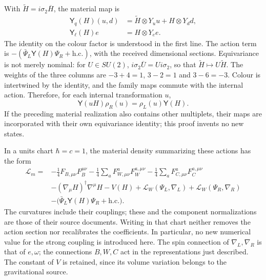 With \(\widetilde H=i\sigma_2\overline H\), the material map is
\begin{equation}
 \begin{split}
 \mathsf Y_q(H)(u,d)&=
       \widetilde H\otimes Y_u u+H\otimes Y_d d,\\
 \mathsf Y_\ell(H)e&=H\otimes Y_e e .
 \end{split}
 \label{hmtcuatro:yukawa}
\end{equation}
The identity on the colour factor is understood in the first line. The action term is \(-(\bar\Psi_L\mathsf Y(H)\Psi_R+\mathrm{h.c.})\), with the received dimensional sections. Equivariance is not merely nominal: for \(U\in SU(2)\), \(i\sigma_2\overline U=U i\sigma_2\), so that \(\widetilde H\mapsto U\widetilde H\). The weights of the three columns are \(-3+4=1\), \(3-2=1\) and \(3-6=-3\). Colour is intertwined by the identity, and the family maps commute with the internal action. Therefore, for each internal transformation \(u\),
\begin{equation}
 \mathsf Y(uH)\rho_R(u)=\rho_L(u)\mathsf Y(H).
 \label{hmtcuatro:equivariancia-yukawa}
\end{equation}
If the preceding material realization also contains other multiplets, their maps are incorporated with their own equivariance identity; this proof invents no new states.

In a units chart \(\hbar=c=1\), the material density summarizing these actions has the form
\begin{equation}
 \begin{split}
 \mathcal L_m={}&-\frac14 F_{B,\mu\nu}F_B^{\mu\nu}
 -\frac14\sum_a F_{W,\mu\nu}^aF_W^{a,\mu\nu}
 -\frac14\sum_a F_{C,\mu\nu}^aF_C^{a,\mu\nu}\\
 &-(\nabla_\mu H)^\dagger\nabla^\mu H-V(H)
 +\mathcal L_W(\Psi_L,\nabla_L)+\mathcal L_W(\Psi_R,\nabla_R)\\
 &-\bigl(\bar\Psi_L\mathsf Y(H)\Psi_R+\mathrm{h.c.}\bigr).
 \end{split}
 \label{hmtcuatro:densidad-material}
\end{equation}
The curvatures include their couplings; these and the component normalizations are those of their source documents. Writing in that chart neither removes the action section nor recalibrates the coefficients. In particular, no new numerical value for the strong coupling is introduced here. The spin connection of \(\nabla_L,\nabla_R\) is that of \(e,\omega\); the connections \(B,W,C\) act in the representations just described. The constant of \(V\) is retained, since its volume variation belongs to the gravitational source.

